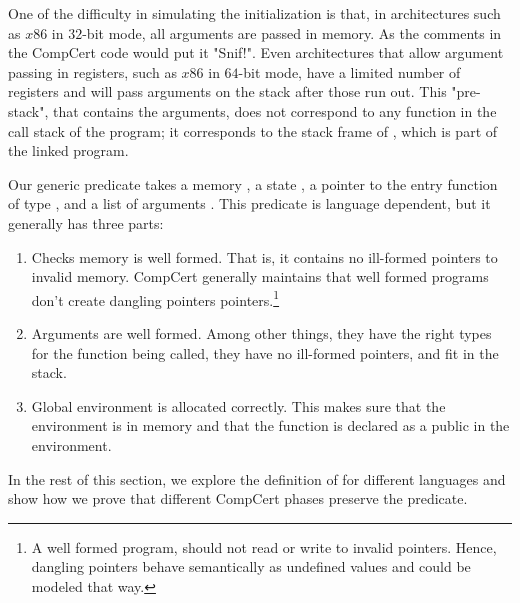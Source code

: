 One of the difficulty in simulating the initialization is that, in architectures such as $x86$ in $32$-bit mode, all arguments are passed in memory. As the comments in the CompCert code would put it "Snif!"\cite{leroy19:compcert}. Even architectures that allow argument passing in registers, such as $x86$ in $64$-bit mode, have a limited number of registers and will pass arguments on the stack after those run out. This "pre-stack", that contains the arguments, does not correspond to any function in the call stack of the program; it corresponds to the stack frame of , which is part of the linked program.

Our generic predicate  takes a memory , a state , a pointer to the entry function  of type , and a list of arguments . This predicate is language dependent, but it generally has three parts:
\begin{enumerate}
\item Checks memory is well formed. That is, it contains no ill-formed pointers to invalid memory. CompCert generally maintains that well formed programs don't create dangling pointers pointers.\footnote{A well formed program, should not read or write to invalid pointers. Hence, dangling pointers behave semantically as undefined values and could be modeled that way.}
\item Arguments are well formed. Among other things, they have the right types for the function being called, they have no ill-formed pointers, and fit in the stack. 
\item Global environment is allocated correctly. This makes sure that the environment is in memory and that the function is declared as a public in the environment.
\end{enumerate}
In the rest of this section, we explore the definition of  for different languages and show how we prove that different CompCert phases preserve the predicate.

